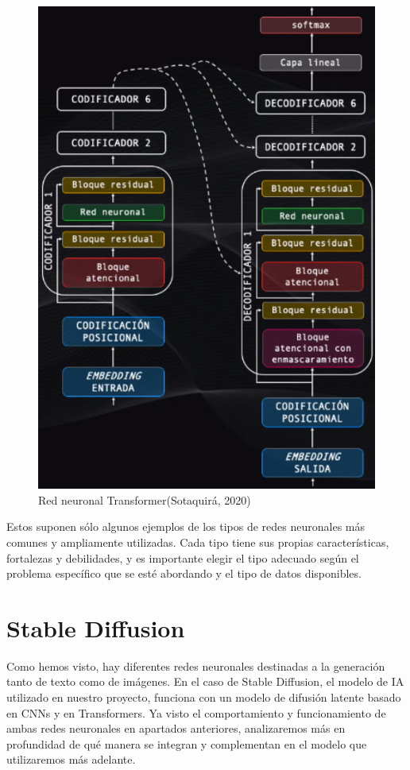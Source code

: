 \begin{figure}[h]
	\centering
	\includegraphics[width = 0.7 \textwidth]{Imagenes/Vectorial/transformer.png}
	\caption{Red neuronal Transformer(Sotaquirá, 2020)}
	\label{fig:transformer}
\end{figure}

Estos suponen sólo algunos ejemplos de los tipos de redes neuronales más comunes y ampliamente utilizadas. Cada tipo tiene sus propias características, fortalezas y debilidades, y es importante elegir el tipo adecuado según el problema específico que se esté abordando y el tipo de datos disponibles.\\

 \section{Stable Diffusion}

Como hemos visto, hay diferentes redes neuronales destinadas a la generación tanto de texto como de imágenes. En el caso de Stable Diffusion, el modelo de IA utilizado en nuestro proyecto, funciona con un modelo de difusión latente basado en CNNs y en Transformers. Ya visto el comportamiento y funcionamiento de ambas redes neuronales en apartados anteriores, analizaremos más en profundidad de qué manera se integran y complementan en el modelo que utilizaremos más adelante.\\


